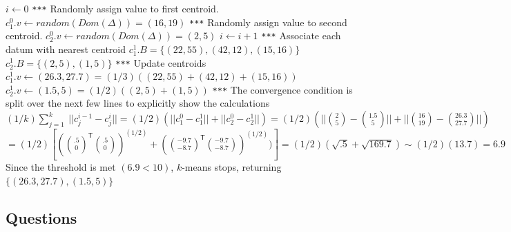 \documentclass{article}
\begin{document}
\begin{center}
\begin{algorithmic}[1]
\State $i \gets 0$
\State \texttt{***} Randomly assign value to first centroid.
\State $c^0_1.v \gets random(Dom(\Delta)) = (16,19)$
\State \texttt{***} Randomly assign value to second centroid.
\State $c^0_2.v \gets random(Dom(\Delta)) = (2,5)$
\State $i \gets i + 1$
\State \texttt{***} Associate each datum with nearest centroid
\State $c^1_1.B = \{(22, 55), (42, 12), (15,16)\}$
\State $c^1_2.B = \{(2,5), (1,5)\}$
\State \texttt{***} Update centroids
\State $c^1_1.v \gets (26.3, 27.7) = (1/3)((22,55) + (42,12) + (15,16))$
\State $c^1_2.v \gets (1.5, 5) = (1/2)((2,5) + (1,5))$
\State \texttt{***} The convergence condition is split over the next few lines to explicitly show the calculations
\State $(1/k)\sum_{j=1}^k~|| c^{i-1}_j-c^{i}_j|| = (1/2)(||c^0_1 - c^1_1||+ ||c^0_2 - c^1_2||) = (1/2) (||{2 \choose 5} - {1.5 \choose 5}|| + ||{16 \choose 19} - {26.3 \choose 27.7}||)$
\State $ = (1/2)[({.5 \choose 0}^{\mathsf{T}}{.5 \choose 0})^{(1/2)} + ({-9.7 \choose  -8.7}^{\mathsf{T}}{-9.7 \choose  -8.7})^{(1/2)})] = (1/2)(\sqrt{.5} + \sqrt{169.7}) \sim (1/2)(13.7) = 6.9$
\State Since the threshold is met $(6.9 < 10)$, $k$-means stops, returning $\{(26.3, 27.7), (1.5,5)\}$
\end{algorithmic}
\end{center}



\subsection*{Questions}
\end{document}

